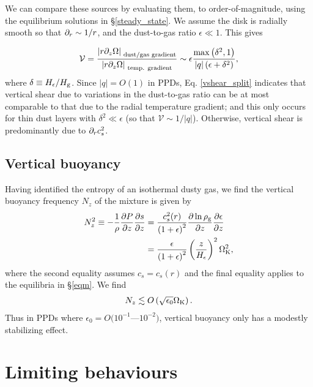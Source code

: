 We can compare these sources by
evaluating them, to order-of-magnitude, using the equilibrium
solutions in \S\ref{steady_state}. We assume the disk is radially
smooth so that $\partial_r\sim 1/r$, and the dust-to-gas ratio
$\epsilon\ll1$. This gives 

\begin{align}\label{vshear_split}
  \mathcal{V} =  \frac{\left|r\partial_z\Omega\right|_{\text{
        dust/gas gradient}}}{\left|r\partial_z\Omega\right|_{\text{
        temp. gradient}}} \sim
  \epsilon \frac{\mathrm{max}\left(\delta^2,
    1\right)}{\left|q\right|\left(\epsilon + \delta^2\right)},
\end{align}
where $\delta\equiv H_\epsilon/H_\mathrm{g}$. 
Since $|q|=O(1)$ in PPDs, Eq. \ref{vshear_split} indicates that
vertical shear due to variations in the dust-to-gas ratio can be at
most comparable to that due to the radial temperature gradient; and
this only occurs for thin dust layers with $\delta^2\ll \epsilon$ (so
that $\mathcal{V}\sim 1/|q|$). Otherwise, vertical shear is
predominantly due to $\partial_rc_s^2$. 

\subsection{Vertical buoyancy}
Having identified the entropy of an isothermal dusty gas, we find the
vertical buoyancy frequency $N_z$ of the mixture is given by 
\begin{align}
  N_z^2 \equiv - \frac{1}{\rho}\frac{\partial P}{\partial z}\frac{\partial s}{\partial z} &=
  \frac{c_s^2(r)}{\left(1+\epsilon\right)^2}\frac{\partial\ln\rho_\mathrm{g}}{\partial 
  z}\frac{\partial\epsilon}{\partial z} \\ &
                                  =
  \frac{\epsilon}{\left(1+\epsilon\right)^2}\left(\frac{z}{H_\epsilon}\right)^2\Omega_{\rm K}^2\notag,  
\end{align}
where the second equality assumes $c_s=c_s(r)$ and the final equality
applies to the equilibria in \S\ref{eqm}. We find 
\begin{align*}
N_z\lesssim
O\left(\sqrt{\epsilon_0}\Omega_{\rm K}\right). 
\end{align*}
Thus in PPDs where $\epsilon_0 = O(10^{-1}$---$10^{-2})$, 
vertical buoyancy only has a modestly stabilizing effect. 





\section{Limiting behaviours}

